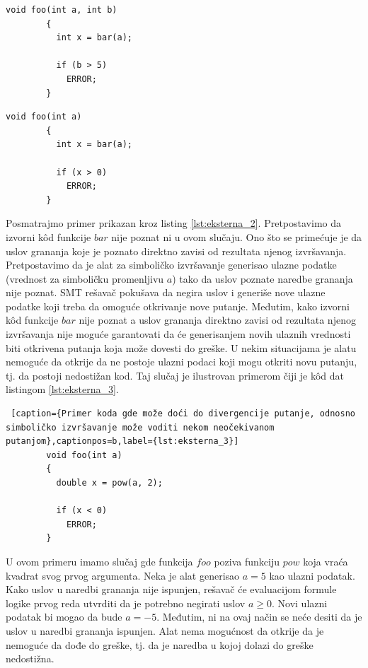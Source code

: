 \documentclass[12pt,oneside]{memoir}
\begin{document}
\bigbreak
    \begin{lstlisting}[caption={Primer koda gde rezultat izvršavanja eksterne funkcije nije važan},captionpos=b,label={lst:eksterna_1}]
        void foo(int a, int b)
        {
          int x = bar(a);
          
          if (b > 5)
            ERROR;
        }
    \end{lstlisting}
\bigbreak

\bigbreak
    \begin{lstlisting}[caption={Primer koda gde je rezultat izvršavanja eksterne funkcije važan},captionpos=b,label={lst:eksterna_2}]
        void foo(int a)
        {
          int x = bar(a);
          
          if (x > 0)
            ERROR;
        }
    \end{lstlisting}
\bigbreak

Posmatrajmo primer prikazan kroz listing \ref{lst:eksterna_2}. Pretpostavimo da izvorni k\^od funkcije $bar$ nije poznat ni u ovom slučaju. Ono što se primećuje je da uslov grananja koje je poznato direktno zavisi od rezultata njenog izvršavanja. Pretpostavimo da je alat za simboličko izvršavanje generisao ulazne podatke (vrednost za simboličku promenljivu $a$) tako da uslov poznate naredbe grananja nije poznat. SMT rešavač pokušava da negira uslov i generiše nove ulazne podatke koji treba da omoguće otkrivanje nove putanje. Međutim, kako izvorni k\^od funkcije $bar$ nije poznat a uslov grananja direktno zavisi od rezultata njenog izvršavanja nije moguće garantovati da će generisanjem novih ulaznih vrednosti biti otkrivena putanja koja može dovesti do greške. U nekim situacijama je alatu nemoguće da otkrije da ne postoje ulazni podaci koji mogu otkriti novu putanju, tj. da postoji nedostižan kod. Taj slučaj je ilustrovan primerom čiji je k\^od dat listingom \ref{lst:eksterna_3}.

    \begin{lstlisting} [caption={Primer koda gde može doći do divergencije putanje, odnosno simboličko izvršavanje može voditi nekom neočekivanom putanjom},captionpos=b,label={lst:eksterna_3}]
        void foo(int a)
        {
          double x = pow(a, 2);
          
          if (x < 0)
            ERROR;
        }
    \end{lstlisting}
\bigbreak

U ovom primeru imamo slučaj gde funkcija $foo$ poziva funkciju $pow$ koja vraća kvadrat svog prvog argumenta. Neka je alat generisao $a = 5$ kao ulazni podatak. Kako uslov u naredbi grananja nije ispunjen, rešavač će evaluacijom formule logike prvog reda utvrditi da je potrebno negirati uslov $a \geq 0$. Novi ulazni podatak bi mogao da bude $a = -5$. Međutim, ni na ovaj način se neće desiti da je uslov u naredbi grananja ispunjen. Alat nema mogućnost da otkrije da je nemoguće da dođe do greške, tj. da je naredba u kojoj dolazi do greške nedostižna. 
\end{document}
